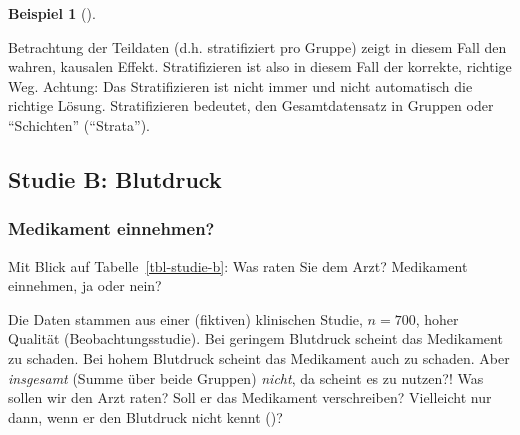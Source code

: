 \documentclass[
  ngerman,
  letterpaper,
  twoside,
  open=any]{scrbook}
\theoremstyle{definition}
\newtheorem{example}{Beispiel}[chapter]
\theoremstyle{plain}
\theoremstyle{definition}
\theoremstyle{definition}
\theoremstyle{remark}
\begin{document}
\begin{example}[]
\begin{tcolorbox}
Betrachtung der Teildaten (d.h. stratifiziert pro Gruppe) zeigt in
diesem Fall den wahren, kausalen Effekt. Stratifizieren ist also in
diesem Fall der korrekte, richtige Weg. Achtung: Das Stratifizieren ist
nicht immer und nicht automatisch die richtige Lösung. Stratifizieren
bedeutet, den Gesamtdatensatz in Gruppen oder \enquote{Schichten}
(\enquote{Strata}).

\end{tcolorbox}

\subsection{Studie B: Blutdruck}\label{studie-b-blutdruck-1}

\subsubsection{Medikament einnehmen?}\label{medikament-einnehmen-1}

Mit Blick auf Tabelle~\ref{tbl-studie-b}: Was raten Sie dem Arzt?
Medikament einnehmen, ja oder nein?

\begin{table}

\caption{\label{tbl-studie-b}Daten zur Wirksamkeit eines Medikaments
(Studie B)}


\end{table}%

Die Daten stammen aus einer (fiktiven) klinischen Studie, \(n=700\),
hoher Qualität (Beobachtungsstudie). Bei geringem Blutdruck scheint das
Medikament zu schaden. Bei hohem Blutdruck scheint das Medikament auch
zu schaden. Aber \emph{insgesamt} (Summe über beide Gruppen)
\emph{nicht}, da scheint es zu nutzen?! Was sollen wir den Arzt raten?
Soll er das Medikament verschreiben? Vielleicht nur dann, wenn er den
Blutdruck nicht kennt ()?


\end{example}
\end{document}
